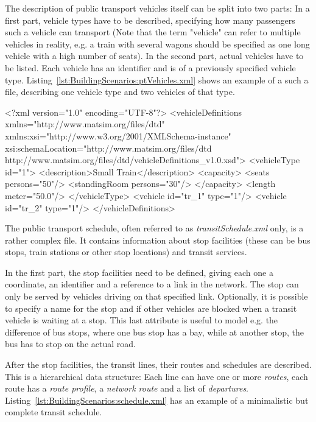 The description of public transport vehicles itself can be split into two parts:
In a first part, vehicle types have to be described, specifying how many
passengers such a vehicle can transport (Note that the term "vehicle" can refer
to multiple vehicles in reality, e.g. a train with several wagons should be specified as
one long vehicle with a high number of seats). In the second part, actual
vehicles have to be listed. Each vehicle has an identifier and is of a previously
specified vehicle type. Listing~\ref{lst:BuildingScenarios:ptVehicles.xml} shows
an example of a such a file, describing one vehicle type and two vehicles of
that type.

\begin{xml-file}[caption=An example of transitVehicles.xml,
label=lst:BuildingScenarios:ptVehicles.xml]
<?xml version="1.0" encoding="UTF-8"?>
<vehicleDefinitions xmlns="http://www.matsim.org/files/dtd"
       xmlns:xsi="http://www.w3.org/2001/XMLSchema-instance"
       xsi:schemaLocation="http://www.matsim.org/files/dtd 
                     http://www.matsim.org/files/dtd/vehicleDefinitions_v1.0.xsd">
<vehicleType id="1">
		<description>Small Train</description>
		<capacity>
			<seats persons="50"/>
			<standingRoom persons="30"/>
		</capacity>
		<length meter="50.0"/>
	</vehicleType>
	<vehicle id="tr_1" type="1"/>
	<vehicle id="tr_2" type="1"/>
</vehicleDefinitions>
\end{xml-file}

The public transport schedule, often referred to as \emph{transitSchedule.xml}
only, is a rather complex file. It contains information about stop facilities
(these can be bus stops, train stations or other stop locations) and transit
services.

In the first part, the stop facilities need to be defined, giving each one a
coordinate, an identifier and a reference to a link in the network. The stop can
only be served by vehicles driving on that specified link. Optionally, it is
possible to specify a name for the stop and if other vehicles are blocked
when a transit vehicle is waiting at a stop. This last attribute is useful to
model e.g. the difference of bus stops, where one bus stop has a bay, while at
another stop, the bus has to stop on the actual road.

After the stop facilities, the transit lines, their routes and schedules
are described. This is a hierarchical data structure: Each line can have one or
more \emph{routes}, each route has a \emph{route profile}, a \emph{network
route} and a list of \emph{departures}.
Listing~\ref{lst:BuildingScenarios:schedule.xml} has an example of a
minimalistic but complete transit schedule.

